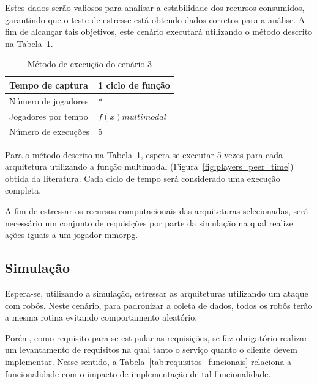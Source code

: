 Estes dados serão valiosos para analisar a estabilidade dos recursos consumidos, garantindo que o teste de estresse está obtendo dados corretos para a análise.
%
A fim de alcançar tais objetivos, este cenário executará utilizando o método descrito na Tabela~\ref{tab:cenario_3}.

\begin{table}[htb!]
\centering
\caption{Método de execução do cenário 3}
\label{tab:cenario_3}
\begin{tabular}{|l|l|}
\hline
Tempo de captura    &  1 ciclo de função \\ \hline
Número de jogadores & *                 \\ \hline
Jogadores por tempo & $f(x) multimodal$ \\ \hline
Número de execuções & 5                 \\ \hline
\end{tabular}
\end{table}

Para o método descrito na Tabela~\ref{tab:cenario_3}, espera-se executar 5 vezes para cada arquitetura utilizando a função multimodal (Figura~\ref{fig:players_peer_time}) obtida da literatura.
Cada ciclo de tempo será considerado uma execução completa.

A fim de estressar os recursos computacionais das arquiteturas selecionadas, será necessário um conjunto de requisições por parte da simulação na qual realize ações iguais a um jogador \ac{mmorpg}.

\subsection{Simulação}

Espera-se, utilizando a simulação, estressar as arquiteturas utilizando um ataque com robôs.
%
Neste cenário, para padronizar a coleta de dados, todos os robôs terão a mesma rotina evitando comportamento aleatório.

Porém, como requisito para se estipular as requisições, se faz obrigatório realizar um levantamento de requisitos na qual tanto o serviço quanto o cliente devem implementar.
%
Nesse sentido, a Tabela~\ref{tab:requisitos_funcionais} relaciona a funcionalidade com o impacto de implementação de tal funcionalidade.


